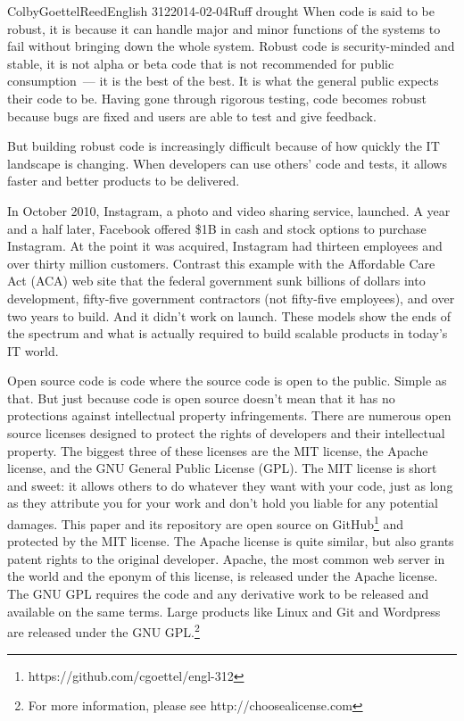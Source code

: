 \documentclass[12pt]{article}
\begin{document}
\begin{mla}{Colby}{Goettel}{Reed}{English 312}{2014-02-04}{Ruff drought}
When code is said to be robust, it is because it can handle major and minor functions of the systems to fail without bringing down the whole system. Robust code is security-minded and stable, it is not alpha or beta code that is not recommended for public consumption~--- it is the best of the best. It is what the general public expects their code to be. Having gone through rigorous testing, code becomes robust because bugs are fixed and users are able to test and give feedback.

But building robust code is increasingly difficult because of how quickly the IT landscape is changing. When developers can use others' code and tests, it allows faster and better products to be delivered.

In October 2010, Instagram, a photo and video sharing service, launched. A year and a half later, Facebook offered \$1B in cash and stock options to purchase Instagram. At the point it was acquired, Instagram had thirteen employees and over thirty million customers. Contrast this example with the Affordable Care Act (ACA) web site that the federal government sunk billions of dollars into development, fifty-five government contractors (not fifty-five employees), and over two years to build. And it didn't work on launch. These models show the ends of the spectrum and what is actually required to build scalable products in today's IT world.

Open source code is code where the source code is open to the public. Simple as that. But just because code is open source doesn't mean that it has no protections against intellectual property infringements. There are numerous open source licenses designed to protect the rights of developers and their intellectual property. The biggest three of these licenses are the MIT license, the Apache license, and the GNU General Public License (GPL). The MIT license is short and sweet: it allows others to do whatever they want with your code, just as long as they attribute you for your work and don't hold you liable for any potential damages. This paper and its repository are open source on GitHub\footnote{https://github.com/cgoettel/engl-312} and protected by the MIT license. The Apache license is quite similar, but also grants patent rights to the original developer. Apache, the most common web server in the world and the eponym of this license, is released under the Apache license. The GNU GPL requires the code and any derivative work to be released and available on the same terms. Large products like Linux and Git and Wordpress are released under the GNU GPL.\footnote{For more information, please see http://choosealicense.com}


\end{mla}
\end{document}
